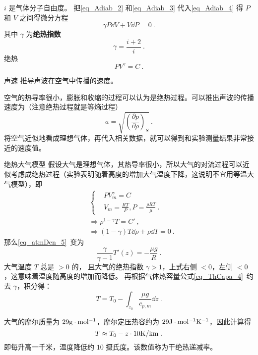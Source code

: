 $i$ 是气体分子自由度。 把\autoref{eq_Adiab_2} 和\autoref{eq_Adiab_3} 代入\autoref{eq_Adiab_4} 得 $P$ 和 $V$ 之间得微分方程
\begin{equation}
\gamma P\dd{V} + V \dd{P} = 0~.
\end{equation}
其中 $\gamma$ 为\textbf{绝热指数}
\begin{equation}
\gamma = \frac{i+2}{i}~.
\end{equation}
绝热
\begin{equation}
P V^\gamma = C~.
\end{equation}


\begin{example}{声速}
推导声波在空气中传播的速度。

空气的热导率很小，膨胀和收缩的过程可以认为是绝热过程。可以推出声波的传播速度为（注意绝热过程就是等熵过程）
\begin{equation}
a=\sqrt{\left(\frac{\partial p}{\partial \rho}\right)_S}~.
\end{equation}
将空气近似地看成理想气体，再代入相关数据，就可以得到和实验测量结果非常接近的速度值。
\end{example}
\begin{example}{绝热大气模型}
假设大气是理想气体，其热导率很小，所以大气的对流过程可以近似考虑成绝热过程（实验表明随着高度的增加大气温度下降，这说明不宜用等温大气模型），即
\begin{equation}
\begin{aligned}
&\begin{cases}
&PV_m^\gamma=C\\
&V_m=\frac{RT}{P},P=\frac{\rho R T}{\mu}~.
\end{cases}
\\
&\Rightarrow \rho^{1-\gamma}T=C'~,\\
&\Rightarrow (1-\gamma)T\dd \rho+\rho\dd T=0~.
\end{aligned}
\end{equation}
那么\autoref{eq_atmDen_5}~变为
\begin{equation}
\frac{\gamma}{\gamma-1}T'(z)=-\frac{\mu g}{R}~.
\end{equation}
大气温度 $T$ 总是 $>0$ 的， 且大气的绝热指数 $\gamma>1$，上式右侧 $<0$，左侧 $<0$，这意味着温度随高度的增加而降低。 再根据气体热容量公式\autoref{eq_ThCapa_4}~约去 $\gamma$，积分得：
\begin{equation}\label{eq_Adiab_6}
T=T_0-\int_{z_0}\frac{\mu g}{c_{p,m}} \dd z ~.
\end{equation}


大气的摩尔质量为 $29 \rm{g\cdot mol^{-1}}$，摩尔定压热容约为 $29 \rm{J\cdot mol^{-1}K^{-1}}$，因此计算得
\begin{equation}
T\approx T_0-z\cdot 10 \rm{K/km}~.
\end{equation}
即每升高一千米，温度降低约 $10$ 摄氏度。该数值称为干绝热递减率。
\end{example}
